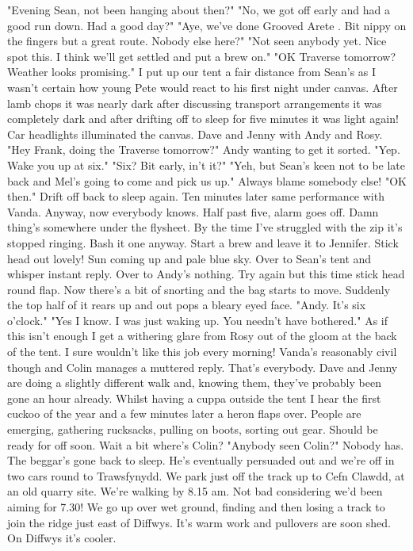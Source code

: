 \documentclass[a5paper,openany,font 10pt]{scrbook}
\begin{document}
"Evening Sean, not been hanging about then?"
"No, we got off early and had a good run down. Had a good
day?"
"Aye, we've done  Grooved Arete . Bit nippy on the fingers but
a great route. Nobody else here?"
"Not seen anybody yet. Nice spot this. I think we'll get
settled and put a brew on."
"OK Traverse tomorrow? Weather looks promising."
I put up our tent a fair distance from Sean's as I wasn't
certain how young Pete would react to his first night under
canvas. After lamb chops it was nearly dark  after discussing
transport arrangements it  was  completely dark  and after drifting
off to sleep for five minutes it was light again! Car headlights
illuminated the canvas. Dave and Jenny with Andy and Rosy.
"Hey Frank, doing the Traverse tomorrow?" Andy wanting to
get it sorted.
"Yep. Wake you up at six."
"Six? Bit early, in't it?"
"Yeh, but Sean's keen not to be late back and Mel's going to
come and pick us up."  Always blame somebody else!
"OK then."
Drift off back to sleep again. Ten minutes later   same
performance with Vanda. Anyway, now everybody knows.
Half past five, alarm goes off. Damn thing's somewhere under
the flysheet. By the time I've struggled with the zip it's
stopped ringing. Bash it one anyway. Start a brew and leave it to
Jennifer. Stick head out   lovely! Sun coming up and pale blue
sky. Over to Sean's tent and whisper   instant reply. Over to
Andy's   nothing. Try again but this time stick head round flap.
Now there's a bit of snorting and the bag starts to move.
Suddenly the top half of it rears up and out pops a bleary eyed
face.
"Andy. It's six o'clock."    "Yes I know. I was just waking up. You needn't have
bothered."
As if this isn't enough I get a withering glare from Rosy
out of the gloom at the back of the tent. I sure wouldn't like
this job every morning! Vanda's reasonably civil though and Colin
manages a muttered reply. That's everybody. Dave and Jenny are
doing a slightly different walk and, knowing them, they've
probably been gone an hour already.
Whilst having a cuppa outside the tent I hear the first
cuckoo of the year and a few minutes later a heron flaps over.
People are emerging, gathering rucksacks, pulling on boots,
sorting out gear. Should be ready for off soon. Wait a bit
where's Colin?
"Anybody seen Colin?"
Nobody has. The beggar's gone back to sleep. He's eventually
persuaded out and we're off in two cars round to Trawsfynydd.
We park just off the track up to Cefn Clawdd, at an old
quarry site. We're walking by 8.15 am. Not bad considering we'd
been aiming for 7.30! We go up over wet ground, finding and then
losing a track to join the ridge just east of Diffwys. It's warm
work and pullovers are soon shed. On Diffwys it's cooler.
\end{document}
